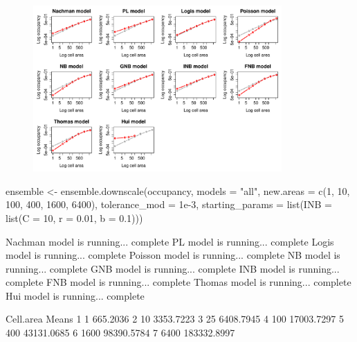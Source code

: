 \documentclass{article}[12pt, a4paper]
\begin{document}
\begin{figure}[!ht]
\centering
\includegraphics[width=9.5cm]{Downscaling-downscale41}
\end{figure}

\begin{Schunk}
\begin{Sinput}
ensemble <- ensemble.downscale(occupancy,
                               models = "all",
                               new.areas = c(1, 10, 100, 400, 1600, 6400),
                               tolerance_mod = 1e-3,
                               starting_params = list(INB = list(C = 10,
                                                                 r = 0.01,
                                                                 b = 0.1)))
\end{Sinput}
\begin{Soutput}
Nachman model is running...  complete 
PL model is running...  complete 
Logis model is running...  complete 
Poisson model is running...  complete 
NB model is running...  complete 
GNB model is running...  complete 
INB model is running...  complete 
FNB model is running...  complete 
Thomas model is running...  complete 
Hui model is running...  complete 
\end{Soutput}


\begin{Soutput}
  Cell.area       Means
1         1    665.2036
2        10   3353.7223
3        25   6408.7945
4       100  17003.7297
5       400  43131.0685
6      1600  98390.5784
7      6400 183332.8997
\end{Soutput}
\end{Schunk}
\end{document}
